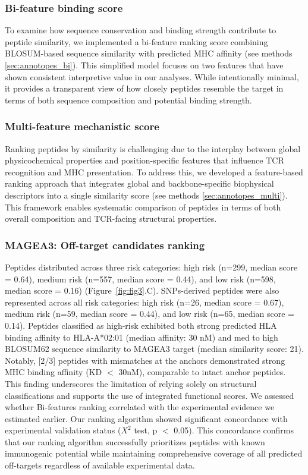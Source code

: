 \documentclass[unnumsec,webpdf,contemporary,large]{oup-authoring-template}%
\theoremstyle{thmstyleone}%
\theoremstyle{thmstyletwo}%
\theoremstyle{thmstylethree}%
\begin{document}
        \subsubsection{\textbf{Bi-feature binding score}} 
        To examine how sequence conservation and binding strength contribute to peptide similarity, we implemented a bi-feature ranking score combining BLOSUM-based sequence similarity with predicted MHC affinity (see methods \ref{sec:annotopes_bi}). This simplified model focuses on two features that have shown consistent interpretive value in our analyses. While intentionally minimal, it provides a transparent view of how closely peptides resemble the target in terms of both sequence composition and potential binding strength.
        
        \subsubsection{\textbf{Multi-feature mechanistic score}} 
        Ranking peptides by similarity is challenging due to the interplay between global physicochemical properties and position-specific features that influence TCR recognition and MHC presentation. To address this, we developed a feature-based ranking approach that integrates global and backbone-specific biophysical descriptors into a single similarity score (see methods \ref{sec:annotopes_multi}). This framework enables systematic comparison of peptides in terms of both overall composition and TCR-facing structural properties. 

        \subsubsection{\textbf{MAGEA3: Off-target candidates ranking}}
        Peptides distributed across three risk categories: high risk (n=299, median score = 0.64), medium risk (n=557, median score = 0.44), and low risk (n=598, median score = 0.16) (Figure~\ref{fig:fig3}.C). SNPs-derived peptides were also represented across all risk categories: high risk (n=26, median score = 0.67), medium risk (n=59, median score = 0.44), and low risk (n=65, median score = 0.14). 
        Peptides classified as high-risk exhibited both strong predicted HLA binding affinity to HLA-A*02:01 (median affinity: 30 nM) and med to high BLOSUM62 sequence similarity to MAGEA3 target (median similarity score: 21). Notably, [2/3] peptides with mismatches at the anchors demonstrated strong MHC binding affinity (KD $<$ 30nM), comparable to intact anchor peptides. This finding underscores the limitation of relying solely on structural classifications and supports the use of integrated functional scores. 
        We assessed whether Bi-features ranking correlated with the experimental evidence we estimated earlier. Our ranking algorithm showed significant concordance with experimental validation status ($X^2$ test, p $<$ 0.05). This concordance confirms that our ranking algorithm successfully prioritizes peptides with known immunogenic potential while maintaining comprehensive coverage of all predicted off-targets regardless of available experimental data.
        
\end{document}
